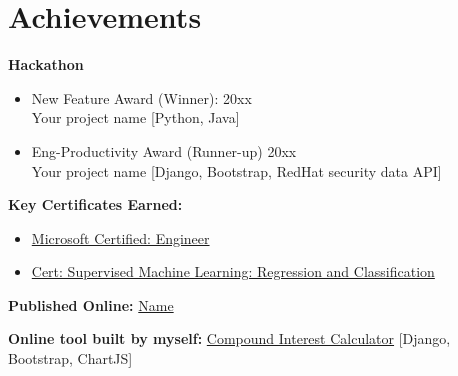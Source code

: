\documentclass[letterpaper, 10pt]{article}
\newcommand{\secStartSpace}{\vspace{3pt}}
\begin{document}
\section{\texorpdfstring{\color{blue} \textbf{Achievements}}{Achievements}}
\secStartSpace

\hypersetup{
    linkcolor=HeaderColor,
    filecolor=HeaderColor,
    urlcolor=LinkColor01,
}

\begin{addmargin}[0.5em]{1em}
        \large\textbf{Hackathon}\hfill
    \begin{itemize}
        \item New Feature Award (Winner): \hfill 20xx \\
        Your project name [Python, Java]
        \item Eng-Productivity Award (Runner-up) \hfill 20xx \\
        Your project name [Django, Bootstrap, RedHat security data API]
    \end{itemize}
\end{addmargin}

\begin{addmargin}[0.5em]{1em}
	\large\textbf{Key Certificates Earned:}\hfill
    \begin{itemize}[itemsep=-2.25pt, leftmargin=1.5em]
        \item \href{https://learn.microsoft.com/en-us/users/Black-Myth/}{Microsoft Certified: Engineer} \hfill 
        \item \href{https://www.coursera.org/account/accomplishments/verify/}{Cert: Supervised Machine Learning: Regression and Classification} \hfill
    \end{itemize}
\end{addmargin}

\begin{addmargin}[0.5em]{1em}
    \large\textbf{Published Online:} \href{https://www.vim.org/scripts/script.php}{Name}
\end{addmargin}

\begin{addmargin}[0.5em]{1em}
    \large\textbf{Online tool built by myself:} \href{https://www.quickcompoundinterestcalculator.com/}{ Compound Interest Calculator} [Django, Bootstrap, ChartJS]
\end{addmargin}


\end{document}
